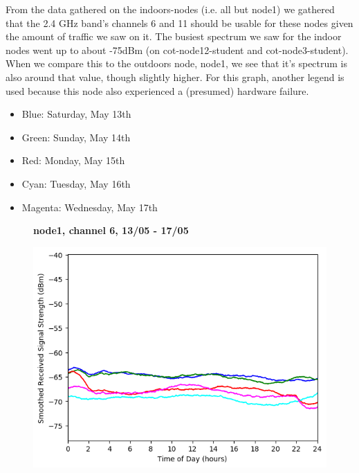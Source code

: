 \documentclass[a4paper, 11pt]{article}
\begin{document}
\newpage
From the data gathered on the indoors-nodes (i.e. all but node1) we gathered that the 2.4 GHz band's channels 6 and 11 should be usable for these nodes given the amount of traffic we saw on it. The busiest spectrum we saw for the indoor nodes went up to about -75dBm (on cot-node12-student and cot-node3-student). When we compare this to the outdoors node, node1, we see that it's spectrum is also around that value, though slightly higher. For this graph, another legend is used because this node also experienced a (presumed) hardware failure.
\begin{itemize}
\setlength\itemsep{-0.4em}
\item Blue: Saturday, May 13th
\item Green: Sunday, May 14th
\item Red: Monday, May 15th
\item Cyan: Tuesday, May 16th
\item Magenta: Wednesday, May 17th
\end{itemize}
\begin{figure}[h!]
    \centering
    \textbf{node1, channel 6, 13/05 - 17/05}\par\medskip
	\includegraphics[scale=0.5]{images/2_4_GHz/node1_2017-05-17_chan6_image.png}
\end{figure}
\end{document}
